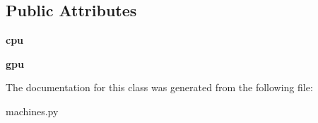 \subsection*{Public Attributes}
\begin{DoxyCompactItemize}
\item 
\mbox{\label{classcodar_1_1savanna_1_1machines_1_1_machine_node_a084bb8daed740edd8b7dd37f8d1f9bab}} 
{\bfseries cpu}
\item 
\mbox{\label{classcodar_1_1savanna_1_1machines_1_1_machine_node_a2ccec1288c1472fc0a5af7787e48da22}} 
{\bfseries gpu}
\end{DoxyCompactItemize}


The documentation for this class was generated from the following file\+:\begin{DoxyCompactItemize}
\item 
machines.\+py\end{DoxyCompactItemize}
